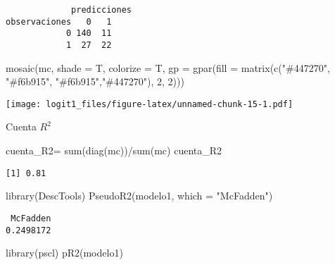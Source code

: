 \documentclass[
]{article}
\newenvironment{Shaded}{\begin{snugshade}}{\end{snugshade}}
\newcommand{\AttributeTok}[1]{\textcolor[rgb]{0.77,0.63,0.00}{#1}}
\newcommand{\DecValTok}[1]{\textcolor[rgb]{0.00,0.00,0.81}{#1}}
\newcommand{\FunctionTok}[1]{\textcolor[rgb]{0.00,0.00,0.00}{#1}}
\newcommand{\NormalTok}[1]{#1}
\newcommand{\OtherTok}[1]{\textcolor[rgb]{0.56,0.35,0.01}{#1}}
\newcommand{\SpecialCharTok}[1]{\textcolor[rgb]{0.00,0.00,0.00}{#1}}
\newcommand{\StringTok}[1]{\textcolor[rgb]{0.31,0.60,0.02}{#1}}
\begin{document}
\begin{verbatim}
             predicciones
observaciones   0   1
            0 140  11
            1  27  22
\end{verbatim}

\begin{Shaded}
\begin{Highlighting}[]
\FunctionTok{mosaic}\NormalTok{(mc, }\AttributeTok{shade =}\NormalTok{ T, }\AttributeTok{colorize =}\NormalTok{ T,}
       \AttributeTok{gp =} \FunctionTok{gpar}\NormalTok{(}\AttributeTok{fill =} \FunctionTok{matrix}\NormalTok{(}\FunctionTok{c}\NormalTok{(}\StringTok{"\#447270"}\NormalTok{, }\StringTok{"\#f6b915"}\NormalTok{, }\StringTok{"\#f6b915"}\NormalTok{,}\StringTok{"\#447270"}\NormalTok{), }\DecValTok{2}\NormalTok{, }\DecValTok{2}\NormalTok{)))}
\end{Highlighting}
\end{Shaded}

\texttt{[image: logit1\_files/figure-latex/unnamed-chunk-15-1.pdf]}

Cuenta \(R^{2}\)

\begin{Shaded}
\begin{Highlighting}[]
\NormalTok{cuenta\_R2}\OtherTok{=} \FunctionTok{sum}\NormalTok{(}\FunctionTok{diag}\NormalTok{(mc))}\SpecialCharTok{/}\FunctionTok{sum}\NormalTok{(mc)}
\NormalTok{cuenta\_R2}
\end{Highlighting}
\end{Shaded}

\begin{verbatim}
[1] 0.81
\end{verbatim}

\begin{Shaded}
\begin{Highlighting}[]
\FunctionTok{library}\NormalTok{(DescTools)}
\FunctionTok{PseudoR2}\NormalTok{(modelo1, }\AttributeTok{which =} \StringTok{"McFadden"}\NormalTok{)}
\end{Highlighting}
\end{Shaded}

\begin{verbatim}
 McFadden 
0.2498172 
\end{verbatim}

\begin{Shaded}
\begin{Highlighting}[]
\FunctionTok{library}\NormalTok{(pscl)}
\FunctionTok{pR2}\NormalTok{(modelo1)}
\end{Highlighting}
\end{Shaded}
\end{document}
